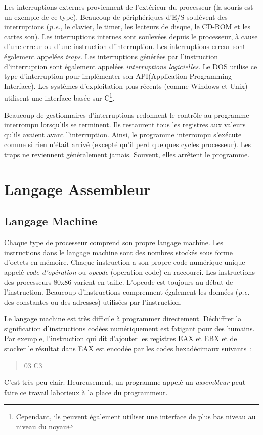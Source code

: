 Les interruptions externes proviennent de l'extérieur du processeur (la souris
est un exemple de ce type). Beaucoup de périphériques d'E/S soulèvent des
interruptions ({\em p.e.\/}, le clavier, le timer, les lecteurs de disque, le CD-ROM
et les cartes son). Les interruptions internes sont soulevées depuis le processeur,
à cause d'une erreur ou d'une instruction d'interruption. Les interruptions
erreur sont également appelées \emph{traps}. Les interruptions générées par l'instruction
d'interruption sont également appelées \emph{interruptions logicielles}. Le DOS
utilise ce type d'interruption pour implémenter son API(Application Programming Interface).
Les systèmes d'exploitation plus récents (comme Windows et Unix) utilisent une interface
basée sur C\footnote{Cependant, ils peuvent également utiliser une interface
de plus bas niveau au niveau du noyau}.

Beaucoup de gestionnaires d'interruptions redonnent le contrôle au programme interrompu
lorsqu'ils se terminent. Ils restaurent tous les registres aux valeurs qu'ils avaient
avant l'interruption. Ainsi, le programme interrompu s'exécute comme si rien
n'était arrivé (excepté qu'il perd quelques cycles processeur). Les traps
ne reviennent généralement jamais. Souvent, elles arrêtent le programme.

\section{Langage Assembleur}

\subsection{Langage Machine}

Chaque type de processeur comprend son propre langage machine. Les instructions
dans le langage machine sont des nombres stockés sous forme d'octets en mémoire.
Chaque instruction a son propre code numérique unique appelé \emph{code d'opération}
ou \emph{opcode} (operation code) en raccourci. Les instructions des processeurs
80x86 varient en taille. L'opcode est toujours au début de l'instruction. Beaucoup
d'instructions comprennent également les données ({\em p.e.\/} des constantes
ou des adresses) utilisées par l'instruction.

Le langage machine est très difficile à programmer directement. Déchiffrer
la signification d'instructions codées numériquement est fatigant pour des
humains. Par exemple, l'instruction qui dit d'ajouter les registres EAX et EBX
et de stocker le résultat dans EAX est encodée par les codes hexadécimaux suivants~:
\begin{quote}
   03 C3
\end{quote}
C'est très peu clair. Heureusement, un programme appelé un \emph{assembleur} 
peut faire ce travail laborieux à la place du programmeur.

